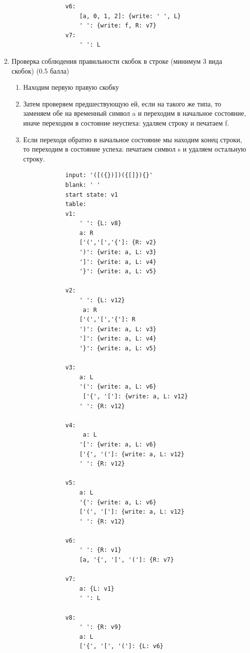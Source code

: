 \documentclass{article}
\begin{document}
\begin{enumerate}
\begin{enumerate}
\begin{lstlisting}
            v6:
                [a, 0, 1, 2]: {write: ' ', L}
                ' ': {write: f, R: v7}
            v7:
                ' ': L
        \end{lstlisting}
    \end{enumerate}
    \item Проверка соблюдения правильности скобок в строке (минимум 3 вида скобок) (0.5 балла)
    \begin{enumerate}
        \item Находим первую правую скобку
        \item Затем проверяем предшествующую ей, если на такого же типа, то заменяем обе на временный символ a и переходим в начальное состояние, иначе переходим в состояние неуспеха: удаляем строку и печатаем f.
        \item Если переходя обратно в начальное состояние мы находим конец строки, то переходим в состояние успеха: печатаем символ s и удаляем остальную строку.
        \begin{lstlisting}
            input: '([({})])({[]}){}'
            blank: ' '
            start state: v1
            table:
            v1:
                ' ': {L: v8}
                a: R
                ['(','[','{']: {R: v2}
                ')': {write: a, L: v3}
                ']': {write: a, L: v4}
                '}': {write: a, L: v5}

            v2:
                ' ': {L: v12}
                 a: R
                ['(','[','{']: R
                ')': {write: a, L: v3}
                ']': {write: a, L: v4}
                '}': {write: a, L: v5}

            v3:
                a: L
                '(': {write: a, L: v6}
                 ['{', '[']: {write: a, L: v12}
                ' ': {R: v12}

            v4:
                 a: L
                '[': {write: a, L: v6}
                ['{', '(']: {write: a, L: v12}
                ' ': {R: v12}

            v5:
                a: L
                '{': {write: a, L: v6}
                ['(', '[']: {write: a, L: v12}
                ' ': {R: v12}

            v6:
                ' ': {R: v1}
                [a, '{', '[', '(']: {R: v7}

            v7:
                a: {L: v1}
                ' ': L

            v8:
                ' ': {R: v9}
                a: L
                ['{', '[', '(']: {L: v6}


\end{lstlisting}
\end{enumerate}
\end{enumerate}
\end{document}
